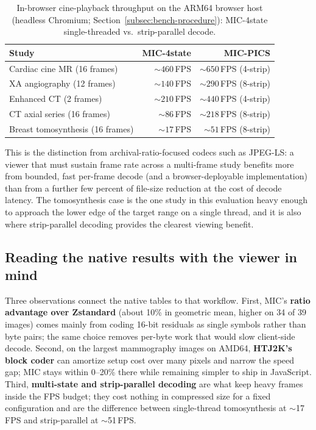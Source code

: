 \documentclass[journal]{IEEEtran}
\begin{document}
\begin{table}[htbp]
\centering
\caption{In-browser cine-playback throughput on the ARM64 browser host
(headless Chromium; Section~\ref{subsec:bench-procedure}): MIC-4state
single-threaded vs.\ strip-parallel decode.}
\label{tab:cine}
\scriptsize
\begin{tabular}{lrr}
\toprule
Study & MIC-4state & MIC-PICS \\
\midrule
Cardiac cine MR (16 frames)      & ${\sim}460$\,FPS & ${\sim}650$\,FPS (4-strip) \\
XA angiography (12 frames)       & ${\sim}140$\,FPS & ${\sim}290$\,FPS (8-strip) \\
Enhanced CT (2 frames)           & ${\sim}210$\,FPS & ${\sim}440$\,FPS (4-strip) \\
CT axial series (16 frames)      & ${\sim}86$\,FPS  & ${\sim}218$\,FPS (8-strip) \\
Breast tomosynthesis (16 frames) & ${\sim}17$\,FPS  & ${\sim}51$\,FPS (8-strip) \\
\bottomrule
\end{tabular}
\end{table}

This is the distinction from archival-ratio-focused codecs such as JPEG-LS: a
viewer that must sustain frame rate across a multi-frame study benefits more
from bounded, fast per-frame decode (and a browser-deployable implementation)
than from a further few percent of file-size reduction at the cost of decode
latency. The tomosynthesis case is the one study in this evaluation heavy enough
to approach the lower edge of the target range on a single thread, and it is
also where strip-parallel decoding provides the clearest viewing benefit.

\subsection{Reading the native results with the viewer in mind}

Three observations connect the native tables to that workflow. First, MIC's
\textbf{ratio advantage over Zstandard} (about 10\% in geometric mean, higher on
34 of 39 images) comes mainly from coding 16-bit residuals as single symbols
rather than byte pairs; the same choice removes per-byte work that would slow
client-side decode. Second, on the largest mammography images on AMD64,
\textbf{HTJ2K's block coder} can amortize setup cost over many pixels and narrow
the speed gap; MIC stays within 0--20\% there while remaining simpler to ship in
JavaScript. Third, \textbf{multi-state and strip-parallel decoding} are what
keep heavy frames inside the FPS budget; they cost nothing in compressed size
for a fixed configuration and are the difference between single-thread
tomosynthesis at ${\sim}$17\,FPS and strip-parallel at ${\sim}$51\,FPS.
\end{document}
